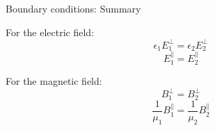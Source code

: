 %
%
%

\begin{frame}{Boundary conditions: Summary}

For the electric field:
{\Large
\begin{equation*}
    \epsilon_1 E_1^{\perp} = \epsilon_2 E_2^{\perp}
\end{equation*}
\vspace{0.1cm}
\begin{equation*}
    E_1^{\parallel} = E_2^{\parallel}
\end{equation*}
}

\vspace{0.2cm}

For the magnetic field:
{\Large
\begin{equation*}
    B_1^{\perp} = B_2^{\perp}
\end{equation*}
\vspace{0.1cm}
\begin{equation*}
    \frac{1}{\mu_1} B_1^{\parallel} = \frac{1}{\mu_2} B_2^{\parallel}
\end{equation*}
}

\end{frame}


%
%

